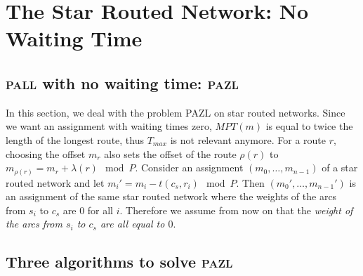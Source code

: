 \documentclass[10pt, conference, letterpaper]{IEEEtran}
\newcommand\pazl{\textsc{pazl}\xspace}
\newcommand\pall{\textsc{pall}\xspace}
\begin{document}
\section{The Star Routed Network: No Waiting Time} \label{sec:PAZL}
  
   
 
  \subsection{\pall with no waiting time: \pazl}
  
     In this section, we deal with the problem PAZL on star routed networks. Since we want an assignment with waiting times zero, $MPT(m)$ is equal to twice the length of the longest route, thus $T_{max}$ is not relevant anymore. For a route $r$, choosing the offset $m_r$ also sets the offset of the route $\rho(r)$ to $m_{\rho(r)} = m_{r} + \lambda(r) \mod P$.
  Consider an assignment $(m_0,\dots,m_{n-1})$ of a star routed network and let $m_i'= m_{i} - t(c_s,r_i) \mod P$.
  Then $(m_0',\dots,m_{n-1}')$ is an assignment of the same star routed network where the weights of the arcs from $s_i$ to $c_s$ are $0$ for all $i$. Therefore we assume from now on that the \emph{weight of the arcs from $s_i$ to $c_s$ are all equal to $0$}.
  
%
%
\subsection{Three algorithms to solve \pazl}
    
\end{document}
